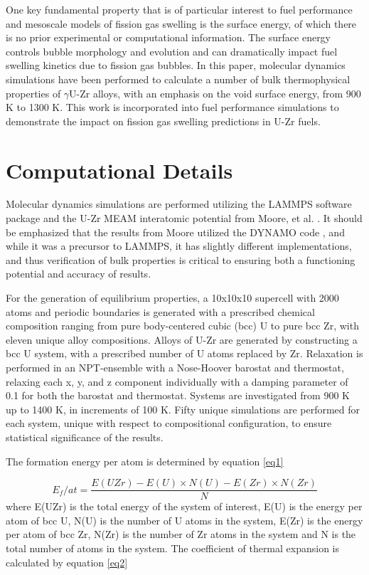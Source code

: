 \documentclass[review]{elsarticle}
\begin{document}
One key fundamental property that is of particular interest to fuel performance and mesoscale models of fission gas swelling is the surface energy, of which there is no prior experimental or computational information. The surface energy controls bubble morphology and evolution and can dramatically impact fuel swelling kinetics due to fission gas bubbles.  In this paper, molecular dynamics simulations have been performed to calculate a number of bulk thermophysical properties of $\gamma$U-Zr alloys, with an emphasis on the void surface energy, from 900 K to 1300 K. This work is incorporated into fuel performance simulations to demonstrate the impact on fission gas swelling predictions in U-Zr fuels.

\section{Computational Details}

Molecular dynamics simulations are performed utilizing the LAMMPS \cite{plimpton1995} software package and the U-Zr MEAM interatomic potential from Moore, et al. \cite{moore2015}. It should be emphasized that the results from Moore \cite{moore2015} utilized the DYNAMO code \cite{dynamo}, and while it was a precursor to LAMMPS, it has slightly different implementations, and thus verification of bulk properties is critical to ensuring both a functioning potential and accuracy of results. 

For the generation of equilibrium properties, a 10x10x10 supercell with 2000 atoms and periodic boundaries is generated with a prescribed chemical composition ranging from pure body-centered cubic (bcc) U to pure bcc Zr, with eleven unique alloy compositions. Alloys of U-Zr are generated by constructing a bcc U system, with a prescribed number of U atoms replaced by Zr. Relaxation is performed in an NPT-ensemble with a Nose-Hoover barostat and thermostat, relaxing each x, y, and z component individually with a damping parameter of 0.1 for both the barostat and thermostat. Systems are investigated from 900 K up to 1400 K, in increments of 100 K. Fifty unique simulations are performed for each system, unique with respect to compositional configuration, to ensure statistical significance of the results.

The formation energy per atom is determined by equation \ref{eq1}

\begin{equation}
\label{eq1}
E_{f}/at= \frac{E(UZr) - E(U)\times N(U) - E(Zr)\times N(Zr)}{N}
\end{equation} where E(UZr) is the total energy of the system of interest, E(U) is the energy per atom of bcc U, N(U) is the number of U atoms in the system, E(Zr) is the energy per atom of bcc Zr, N(Zr) is the number of Zr atoms in the system and N is the total number of atoms in the system. The coefficient of thermal expansion is calculated by equation \ref{eq2}
\end{document}
